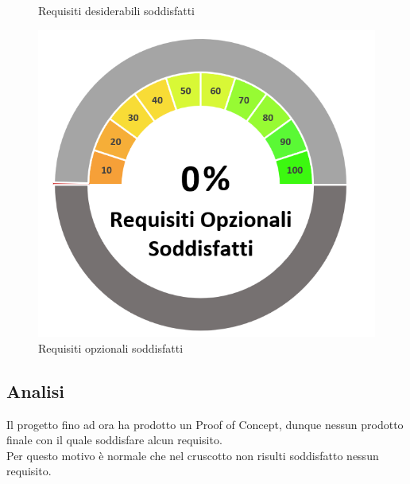 \begin{figure}[H]
\begin{minipage}[b]{0.32\textwidth}
        \caption{Requisiti desiderabili soddisfatti}
        \label{reqdessodd}
    \end{minipage}
    \hfill
    \begin{minipage}[b]{0.32\textwidth}
        \centering
        \includegraphics[width=\textwidth]{ReqOpzSodd.png}
        \caption{Requisiti opzionali soddisfatti}
        \label{reqopzsodd}
    \end{minipage}
\end{figure}
\subsection{Analisi}
Il progetto fino ad ora ha prodotto un Proof of Concept, dunque nessun prodotto finale con il quale soddisfare alcun requisito.\\Per questo motivo è normale che nel cruscotto non risulti soddisfatto nessun requisito.


